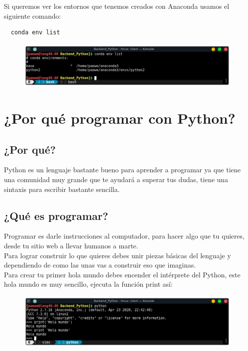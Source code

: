 \documentclass{article}
\begin{document}
Si queremos ver los entornos que tenemos creados con Anaconda usamos el
siguiente comando:

\begin{verbatim}
  conda env list
\end{verbatim}


\begin{figure}[h!]
  \centering
  \includegraphics[scale=0.75]{./Pictures/005_ver_entornos_conda.png}
\end{figure}

\newpage

\section{¿Por qué programar con Python?}%
\subsection{¿Por qué?}%
Python es un lenguaje bastante bueno para aprender a programar ya que tiene una
comunidad muy grande que te ayudará a superar tus dudas, tiene una sintaxis
para escribir bastante sencilla.

\subsection{¿Qué es programar?}%
Programar es darle instrucciones al computador, para hacer algo que tu quieres,
desde tu sitio web a llevar humanos a marte.\\

Para lograr construir lo que quieres debes unir piezas básicas del lenguaje y
dependiendo de como las unas vas a construir eso que imaginas.\\

Para crear tu primer hola mundo debes encender el intérprete del Python, este
hola mundo es muy sencillo, ejecuta la función print así:

\begin{figure}[h!]
  \centering
  \includegraphics[scale=0.75]{./Pictures/005_hola_mundo_python2.png}
\end{figure}
\end{document}
